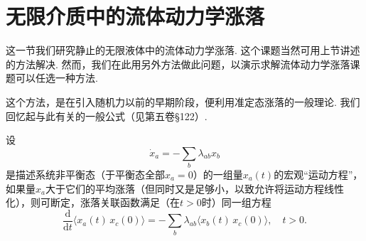 \section{无限介质中的流体动力学涨落}

这一节我们研究静止的无限液体中的流体动力学涨落. 这个课题当然可用上节讲述的方法解决. 然而，我们在此用另外方法做此问题，以演示求解流体动力学涨落课题可以任选一种方法.

这个方法，是在引入随机力以前的早期阶段，便利用准定态涨落的一般理论. 我们回忆起与此有关的一般公式（见第五卷§122）.

设
\begin{equation}
\dot{x}_{a}=-\sum_{b}\lambda_{ab}x_{b}
\end{equation}
是描述系统非平衡态（于平衡态全部$x_{a}=0$）的一组量$x_{a}(t)$的宏观“运动方程”，如果量$x_{a}$大于它们的平均涨落（但同时又是足够小，以致允许将运动方程线性化），则可断定，涨落关联函数满足（在$t>0$时）同一组方程
\begin{equation}
\frac{\mathrm{d}}{\mathrm{d}t}\bigl\langle x_{a}(t)\,x_{c}(0)\bigr\rangle=-\sum_{b}\lambda_{ab}\bigl\langle x_{b}(t)\,x_{c}(0)\bigr\rangle,\quad t>0.
\end{equation}

